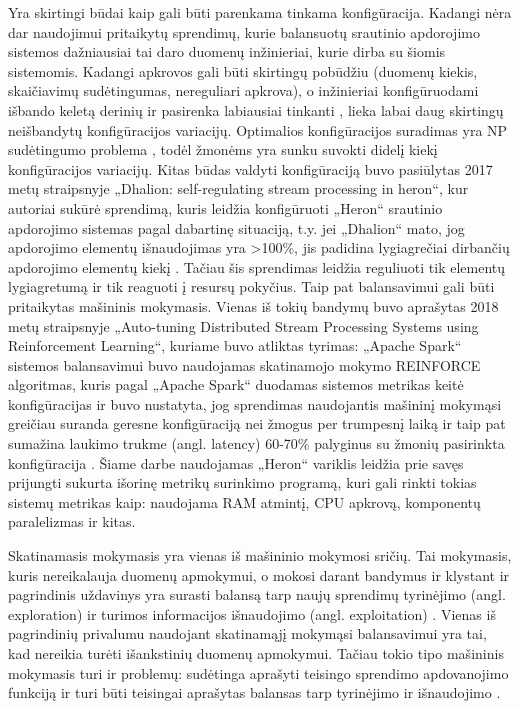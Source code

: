 \documentclass{VUMIFPSbakalaurinis}
\begin{document}
Yra skirtingi būdai kaip gali būti parenkama tinkama konfigūracija. Kadangi nėra dar naudojimui pritaikytų sprendimų, kurie balansuotų srautinio apdorojimo sistemos dažniausiai tai daro duomenų inžinieriai, kurie dirba su šiomis sistemomis. Kadangi apkrovos gali būti skirtingų pobūdžiu (duomenų kiekis, skaičiavimų sudėtingumas, nereguliari apkrova), o inžinieriai konfigūruodami išbando keletą derinių ir pasirenka labiausiai tinkanti \cite{selfRegulatingStreaming}, lieka labai daug skirtingų neišbandytų konfigūracijos variacijų. Optimalios konfigūracijos suradimas yra NP sudėtingumo problema \cite{automateTuning}, todėl žmonėms yra sunku suvokti didelį kiekį konfigūracijos variacijų. 
Kitas būdas valdyti konfigūraciją buvo pasiūlytas 2017 metų straipsnyje „Dhalion: self-regulating stream processing in heron“, kur autoriai sukūrė sprendimą, kuris leidžia konfigūruoti „Heron“ srautinio apdorojimo sistemas pagal dabartinę situaciją, t.y. jei „Dhalion“ mato, jog apdorojimo elementų išnaudojimas yra >100\%, jis padidina lygiagrečiai dirbančių apdorojimo elementų kiekį \cite{dhalion}. Tačiau šis sprendimas leidžia reguliuoti tik elementų lygiagretumą ir tik reaguoti į resursų pokyčius.                         
Taip pat balansavimui gali būti pritaikytas mašininis mokymasis. Vienas iš tokių bandymų buvo aprašytas 2018 metų straipsnyje „Auto-tuning Distributed Stream Processing Systems using Reinforcement Learning“, kuriame buvo atliktas tyrimas: „Apache Spark“ sistemos balansavimui buvo naudojamas skatinamojo mokymo REINFORCE algoritmas, kuris pagal „Apache Spark“ duodamas sistemos metrikas keitė konfigūracijas ir buvo nustatyta, jog sprendimas naudojantis mašininį mokymąsi greičiau suranda geresne konfigūraciją nei žmogus per trumpesnį laiką ir taip pat sumažina laukimo trukme (angl. latency) 60-70\% palyginus su žmonių pasirinkta konfigūracija \cite{vaquero2018autotuning}. Šiame darbe naudojamas „Heron“ variklis leidžia prie savęs prijungti sukurta išorinę metrikų surinkimo programą, kuri gali rinkti tokias sistemų metrikas kaip: naudojama RAM atmintį, CPU apkrovą, komponentų paralelizmas ir kitas. 

Skatinamasis mokymasis yra vienas iš mašininio mokymosi sričių. Tai mokymasis, kuris nereikalauja duomenų apmokymui, o mokosi darant bandymus ir klystant ir pagrindinis uždavinys yra surasti balansą tarp naujų sprendimų tyrinėjimo (angl. exploration) ir turimos informacijos išnaudojimo (angl. exploitation) \cite{reinforcment}. Vienas iš pagrindinių privalumu naudojant skatinamąjį mokymąsi balansavimui yra tai, kad nereikia turėti išankstinių duomenų apmokymui. Tačiau tokio tipo mašininis mokymasis turi ir problemų: sudėtinga aprašyti teisingo sprendimo apdovanojimo funkciją ir turi būti teisingai aprašytas balansas tarp tyrinėjimo ir išnaudojimo  \cite{selfRegulatingStreaming}.
\end{document}

